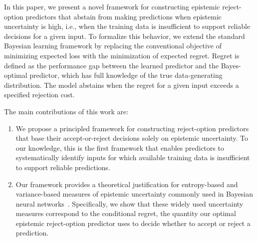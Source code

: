 In this paper, we present a novel framework for constructing epistemic reject-option predictors that abstain from making predictions when epistemic uncertainty is high, i.e., when the training data is insufficient to support reliable decisions for a given input. To formalize this behavior, we extend the standard Bayesian learning framework by replacing the conventional objective of minimizing expected loss with the minimization of expected regret. Regret is defined as the performance gap between the learned predictor and the Bayes-optimal predictor, which has full knowledge of the true data-generating distribution. The model abstains when the regret for a given input exceeds a specified rejection cost.

The main contributions of this work are:
\begin{enumerate}
\item We propose a principled framework for constructing reject-option predictors that base their accept-or-reject decisions solely on epistemic uncertainty. To our knowledge, this is the first framework that enables predictors to systematically identify inputs for which available training data is insufficient to support reliable predictions.
%
\item Our framework provides a theoretical justification for entropy-based and variance-based measures of epistemic uncertainty commonly used in Bayesian neural networks~\cite{Depeweg-Decompos-ICML2018}. Specifically, we show that these widely used uncertainty measures correspond to the conditional regret, the quantity our optimal epistemic reject-option predictor uses to decide whether to accept or reject a prediction.
\end{enumerate}

